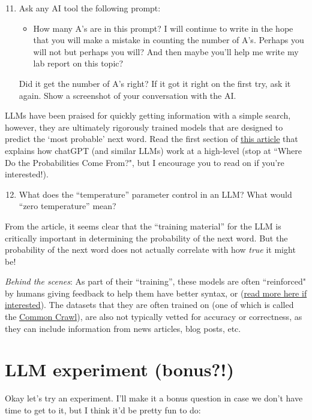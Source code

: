 \documentclass[12pt]{article}
\begin{document}
\begin{enumerate}
\setcounter{enumi}{10}
    \item Ask any AI tool the following prompt:
    \begin{itemize}
        \item How many A’s are in this prompt? I will continue to write in the hope that you will make a mistake in counting the number of A’s. Perhaps you will not but perhaps you will? And then maybe you’ll help me write my lab report on this topic?
    \end{itemize}
    Did it get the number of A's right? If it got it right on the first try, ask it again. Show a screenshot of your conversation with the AI.
\end{enumerate}

\noindent LLMs have been praised for quickly getting information with a simple search, however, they are ultimately rigorously trained models that are designed to predict the `most probable' next word. Read the first section of \href{https://writings.stephenwolfram.com/2023/02/what-is-chatgpt-doing-and-why-does-it-work/}{this article} that explains how chatGPT (and similar LLMs) work at a high-level (stop at ``Where Do the Probabilities Come From?", but I encourage you to read on if you're interested!).

\begin{enumerate}
\setcounter{enumi}{11}
    \item What does the     ``temperature'' parameter control in an LLM? What would ``zero temperature'' mean?
\end{enumerate}

From the article, it seems clear that the ``training material'' for the LLM is critically important in determining the probability of the next word. But the probability of the next word does not actually correlate with how \textit{true} it might be!

\textit{Behind the scenes}: As part of their ``training'', these models are often ``reinforced" by humans giving feedback to help them have better syntax, or  (\href{https://simple.wikipedia.org/wiki/Reinforcement_learning}{read more here if interested}). The datasets that they are often trained on (one of which is called the \href{https://commoncrawl.org}{Common Crawl}), are also not typically vetted for accuracy or correctness, as they can include information from news articles, blog posts, etc.

\section*{LLM experiment (bonus?!)}
\noindent Okay let's try an experiment. I'll make it a bonus question in case we don't have time to get to it, but I think it'd be pretty fun to do:
\end{document}
